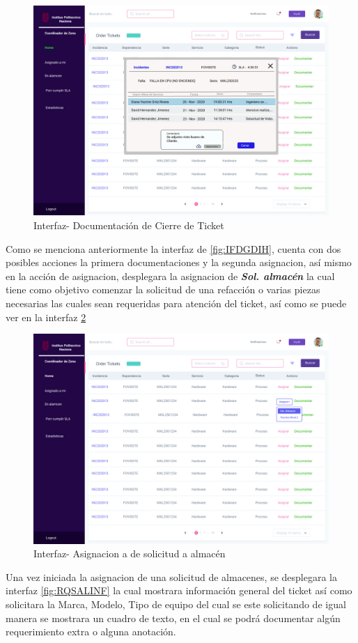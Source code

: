 	\begin{figure}[H]
	\centering
	\includegraphics[width=1.1\textwidth]{Capitulo4/Img/GestionInc/cierre}
	\caption{Interfaz- Documentación de Cierre de Ticket}
	\label{fig:IFDCDT}
\end{figure}


Como se menciona anteriormente la interfaz de  \ref{fig:IFDGDIH}, cuenta con dos posibles acciones la primera documentaciones y la segunda asignacion, así mismo en la acción de asignacion, desplegara la asignacion de\textbf{\textit{ Sol. almacén}} la cual tiene como objetivo comenzar la solicitud de una refacción o varias piezas necesarias las cuales sean requeridas para atención del ticket, así como se puede ver en la interfaz \ref{fig:INDASAMC}  

	\begin{figure}[H]
	\centering
	\includegraphics[width=1.1\textwidth]{Capitulo4/Img/GestionInc/Asi-Almacen}
	\caption{Interfaz- Asignacion a de solicitud a almacén}
	\label{fig:INDASAMC}
\end{figure}
Una vez iniciada la asignacion de una solicitud de almacenes, se desplegara la interfaz \ref{fig:RQSALINF} la cual mostrara información general del ticket así  como solicitara la Marca, Modelo, Tipo de equipo del cual se este solicitando de igual manera se mostrara un cuadro de texto, en el cual se podrá documentar algún requerimiento extra o alguna anotación.

